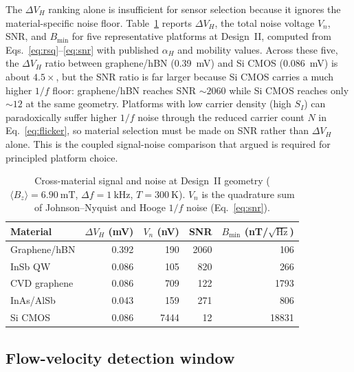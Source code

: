 \documentclass[pdflatex,sn-basic]{sn-jnl}
\theoremstyle{thmstyleone}
\theoremstyle{thmstyletwo}
\theoremstyle{thmstylethree}
\begin{document}
The $\Delta V_H$ ranking alone is insufficient for sensor selection because it ignores the material-specific noise floor. Table~\ref{tab:noise} reports $\Delta V_H$, the total noise voltage $V_n$, SNR, and $B_\text{min}$ for five representative platforms at Design~II, computed from Eqs.~\eqref{eq:rsq}--\eqref{eq:snr} with published $\alpha_H$ and mobility values. Across these five, the $\Delta V_H$ ratio between graphene/hBN (\SI{0.39}{\milli\volt}) and Si CMOS (\SI{0.086}{\milli\volt}) is about $4.5\times$, but the SNR ratio is far larger because Si CMOS carries a much higher $1/f$ floor: graphene/hBN reaches SNR ${\sim}2060$ while Si CMOS reaches only ${\sim}12$ at the same geometry. Platforms with low carrier density (high $S_I$) can paradoxically suffer higher $1/f$ noise through the reduced carrier count $N$ in Eq.~\eqref{eq:flicker}, so material selection must be made on SNR rather than $\Delta V_H$ alone. This is the coupled signal-noise comparison that \citet{mihajlovic2007} argued is required for principled platform choice.

\begin{table}[!htbp]
\caption{Cross-material signal and noise at Design~II geometry ($\langle B_z \rangle = \SI{6.90}{\milli\tesla}$, $\Delta f = \SI{1}{\kilo\hertz}$, $T = \SI{300}{\kelvin}$). $V_n$ is the quadrature sum of Johnson--Nyquist and Hooge $1/f$ noise (Eq.~\eqref{eq:snr}).}
\label{tab:noise}
\centering
\footnotesize
\begin{tabular}{@{}lrrrr@{}}
\toprule
Material & $\Delta V_H$ (mV) & $V_n$ (nV) & SNR & $B_\text{min}$ (nT/$\sqrt{\text{Hz}}$) \\
\midrule
Graphene/hBN & 0.392 & 190 & 2060 & 106 \\
InSb QW      & 0.086 & 105 & 820  & 266 \\
CVD graphene & 0.086 & 709 & 122  & 1793 \\
InAs/AlSb    & 0.043 & 159 & 271  & 806 \\
Si CMOS      & 0.086 & 7444 & 12  & 18831 \\
\bottomrule
\end{tabular}
\end{table}

\subsection{Flow-velocity detection window}\label{sec:flowsensitivity}
\end{document}
